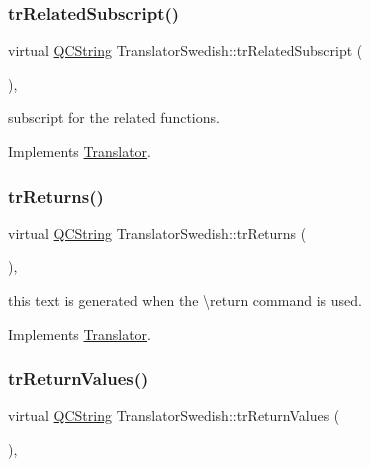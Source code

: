 \subsubsection{\texorpdfstring{trRelatedSubscript()}{trRelatedSubscript()}}
{\footnotesize\ttfamily virtual \mbox{\hyperlink{class_q_c_string}{Q\+C\+String}} Translator\+Swedish\+::tr\+Related\+Subscript (\begin{DoxyParamCaption}{ }\end{DoxyParamCaption})\hspace{0.3cm}{\ttfamily [inline]}, {\ttfamily [virtual]}}

subscript for the related functions. 

Implements \mbox{\hyperlink{class_translator}{Translator}}.

\mbox{\label{class_translator_swedish_aeb784d8b10a25562124603c24430c72f}} 
\subsubsection{\texorpdfstring{trReturns()}{trReturns()}}
{\footnotesize\ttfamily virtual \mbox{\hyperlink{class_q_c_string}{Q\+C\+String}} Translator\+Swedish\+::tr\+Returns (\begin{DoxyParamCaption}{ }\end{DoxyParamCaption})\hspace{0.3cm}{\ttfamily [inline]}, {\ttfamily [virtual]}}

this text is generated when the \textbackslash{}return command is used. 

Implements \mbox{\hyperlink{class_translator}{Translator}}.

\mbox{\label{class_translator_swedish_ab5ee21c0f0b9f5409b0689c9af404fe8}} 
\subsubsection{\texorpdfstring{trReturnValues()}{trReturnValues()}}
{\footnotesize\ttfamily virtual \mbox{\hyperlink{class_q_c_string}{Q\+C\+String}} Translator\+Swedish\+::tr\+Return\+Values (\begin{DoxyParamCaption}{ }\end{DoxyParamCaption})\hspace{0.3cm}{\ttfamily [inline]}, {\ttfamily [virtual]}}

